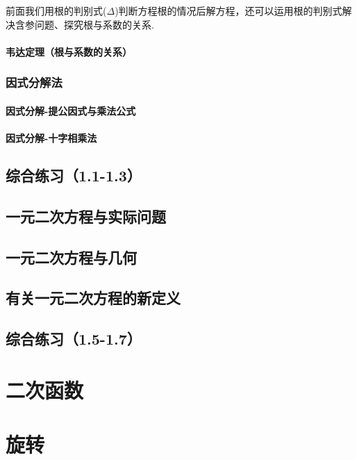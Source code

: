 \documentclass[lang=cn, 10pt, titlestyle=hang, oneside]{elegantbook}
\begin{document}
前面我们用根的判别式(\(\Delta\))判断方程根的情况后解方程，还可以运用根的判别式解决含参问题、探究根与系数的关系.


\subsubsection{韦达定理（根与系数的关系）}



\subsection{因式分解法}

\subsubsection{因式分解-提公因式与乘法公式}

\subsubsection{因式分解-十字相乘法}


\section{综合练习（1.1-1.3）}

\section{一元二次方程与实际问题}

\section{一元二次方程与几何}

\section{有关一元二次方程的新定义}

\section{综合练习（1.5-1.7）}

\chapter{二次函数}

\chapter{旋转}
\end{document}
